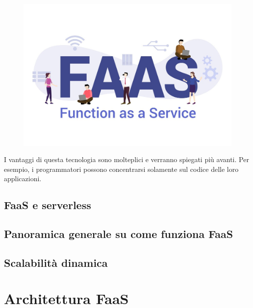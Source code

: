 \documentclass[a4paper]{article}
\begin{document}
	\begin{figure}[!htp]
		\centering
		\includegraphics[width=\textwidth]{img/faas-1.jpg}
	\end{figure}
	
	\noindent
	I vantaggi di questa tecnologia sono molteplici e verranno spiegati più avanti. Per esempio, i programmatori possono concentrarsi solamente sul codice delle loro applicazioni.
	
	\newpage
	
	\subsection{FaaS e serverless}
	
	\subsection{Panoramica generale su come funziona FaaS}
	
	\subsection{Scalabilità dinamica}
	
	\section{Architettura FaaS}
	
\end{document}
